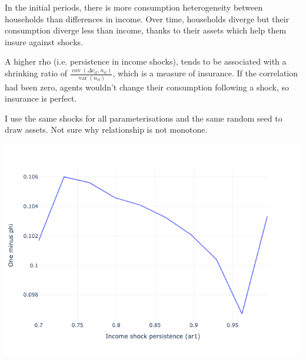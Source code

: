 \begin{questions}
\begin{solution}
In the initial periods, there is more consumption heterogeneity between households than differences in income. Over time, households diverge but their consumption diverge less than income, thanks to their assets which help them insure against shocks. 

\end{solution}

\begin{solution}
A higher rho (i.e. persistence in income shocks), tends to be associated with a shrinking ratio of $\frac{\operatorname{cov}\left(\Delta c_{i t}, n_{i t}\right)}{\operatorname{var}\left(n_{i t}\right)}$, which is a measure of insurance. If the correlation had been zero, agents wouldn't change their consumption following a shock, so insurance is perfect. 

I use the same shocks for all parameterisations and the same random seed to draw assets. Not sure why relationship is not monotone. 

\includegraphics[scale=0.5]{figures/insurance_question.png}

\end{solution}
\end{questions}


